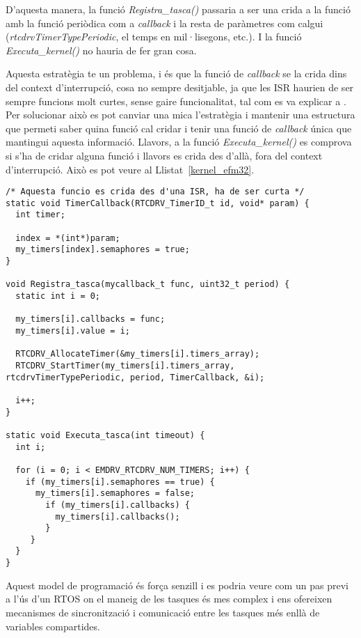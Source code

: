 D'aquesta manera, la funció {\em Registra\_tasca()} passaria a ser una crida a la funció  amb la funció periòdica com a {\em callback} i la resta de paràmetres com calgui ({\em rtcdrvTimerTypePeriodic}, el temps en mil·lisegons, etc.). I la funció {\em Executa\_kernel()} no hauria de fer gran cosa.

Aquesta estratègia te un problema, i és que la funció de {\em callback} se la crida dins del context d'interrupció, cosa no sempre desitjable, ja que les ISR haurien de ser sempre funcions molt curtes, sense gaire funcionalitat, tal com es va explicar a . Per solucionar això es pot canviar una mica l'estratègia i mantenir una estructura que permeti saber quina funció cal cridar i tenir una funció de {\em callback} única que mantingui aquesta informació. Llavors, a la funció {\em Executa\_kernel()} es comprova si s'ha de cridar alguna funció i llavors es crida des d'allà, fora del context d'interrupció. Això es pot veure al Llistat~\ref{kernel_efm32}.

\begin{lstlisting}[style=customc,caption={Estructura bàsica de la funció Executa\_tasca()},label=kernel_efm32]
/* Aquesta funcio es crida des d'una ISR, ha de ser curta */
static void TimerCallback(RTCDRV_TimerID_t id, void* param) {
  int timer;
  
  index = *(int*)param;
  my_timers[index].semaphores = true;
}

void Registra_tasca(mycallback_t func, uint32_t period) {
  static int i = 0;
  
  my_timers[i].callbacks = func;
  my_timers[i].value = i;
  
  RTCDRV_AllocateTimer(&my_timers[i].timers_array);
  RTCDRV_StartTimer(my_timers[i].timers_array, rtcdrvTimerTypePeriodic, period, TimerCallback, &i);
  
  i++;
}

static void Executa_tasca(int timeout) {
  int i;
  
  for (i = 0; i < EMDRV_RTCDRV_NUM_TIMERS; i++) {
    if (my_timers[i].semaphores == true) {
      my_timers[i].semaphores = false;
        if (my_timers[i].callbacks) {
          my_timers[i].callbacks();
        }
     }
  }
}
\end{lstlisting}

Aquest model de programació és força senzill i es podria veure com un pas previ a l'ús d'un RTOS on el maneig de les tasques és mes complex i ens ofereixen mecanismes de sincronització i comunicació entre les tasques més enllà de variables compartides.

